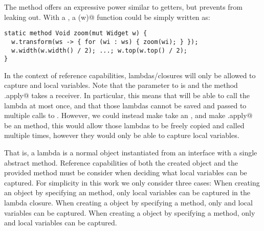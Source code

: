 The \Q@transform@ method offers an expressive power similar to \Q@mut@ getters, but prevents \Q@Widgets@ from leaking out.  With a \Q@Transformer@, a \Q@zoom(w)@ function could be simply written as:
\begin{lstlisting}
static method Void zoom(mut Widget w) {
  w.transform(ws -> { for (wi : ws) { zoom(wi); } });
  w.width(w.width() / 2); ...; w.top(w.top() / 2); 
}
\end{lstlisting}

In the context of reference capabilities, \Q@capsule@ lambdas/closures will only be allowed to capture \Q@imm@ and \Q@capsule@ local variables.
Note that the \Q@Transformer@ parameter to \Q@transform@ is \Q@capsule@ and the method \Q@Trasformer.apply@ takes a \Q@capsule@ receiver. In particular, this means that \Q@transform@ will be able to call the lambda at most once,
and that those lambdas cannot be saved and passed to multiple calls to \Q@transform@.
However, we could instead make \Q@transform@ take an \Q@imm@ \Q@Transformer@, and make \Q@Transformer.apply@ be an \Q@imm@ method, this would allow those lambdas to be freely copied and called multiple times, however they would only be able to capture \Q@imm@ local variables.

That is, a lambda is a normal object instantiated from an interface with a single abstract method.
Reference capabilities of both the created object and the provided method must be consider when deciding what local variables can be captured.
For simplicity in this work we only consider three cases:
When creating an \Q@imm@ object by specifying an \Q@imm@ method, only \Q@imm@ local variables can be captured in the lambda closure.
When creating a \Q@capsule@ object by specifying a \Q@capsule@ method, only \Q@imm@ and \Q@capsule@ local variables can be captured.
When creating a \Q@mut@ object by specifying a \Q@mut@ method, only \Q@imm@ and \Q@mut@ local variables can be captured.



